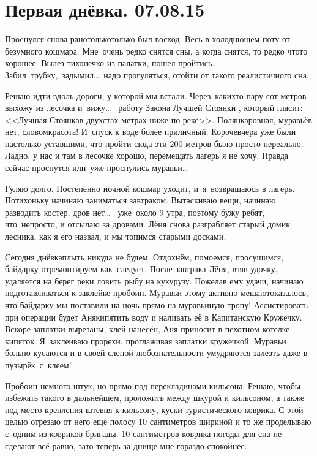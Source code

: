 \chapter{Первая днёвка. 07.08.15}

Проснулся снова рано\mdash только\sdash только был восход. Весь в холоднющем поту от безумного кошмара. Мне~очень редко снятся сны, а когда снятся, то редко что\sdash то хорошее. Вылез тихонечко из палатки, пошел пройтись. Забил~трубку,~задымил\ldots ~надо прогуляться, отойти от такого реалистичного сна.

Решаю идти вдоль дороги, у которой мы встали. Через~каких\sdash то пару сот метров выхожу из лесочка и~вижу\ldots~ работу Закона Лучшей Стоянки \cite{Квадригин}, который гласит: <<Лучшая Стоянка\mdash в двухстах метрах ниже по реке>>. Полянка\mdash ровная, муравьёв нет, словом\mdash красота! И~спуск к воде более приличный. Короче\mdash вчера уже были настолько уставшими, что пройти сюда эти 200 метров было просто нереально. Ладно, у нас и там в лесочке хорошо, перемещать лагерь я не хочу. Правда сейчас проснутся или~уже проснулись муравьи\ldots~

Гуляю долго. Постепенно ночной кошмар уходит, и~я~возвращаюсь в лагерь. Потихоньку начинаю заниматься завтраком. Вытаскиваю вещи, начинаю разводить костер, дров нет\ldots~ уже~около 9 утра, поэтому бужу ребят, что~непросто, и отсылаю за дровами. Лёня снова разграбляет старый домик лесника, как я его назвал, и мы топимся старыми досками. 

Сегодня днёвка\mdash плыть никуда не будем. Отдохнём, помоемся, просушимся, байдарку отремонтируем как~следует. После завтрака Лёня, взяв удочку, удаляется на берег реки ловить рыбу на кукурузу. Пожелав ему удачи, начинаю подготавливаться к заклейке пробоин. Муравьи этому активно мешают\mdash оказалось, что байдарку мы поставили на ночь прямо на муравьиную тропу! Ассистировать при операции будет Аня\mdash кипятить воду и наливать её в Капитанскую Кружечку. Вскоре заплатки вырезаны, клей нанесён, Аня приносит в пехотном котелке кипяток. Я~заклеиваю прорехи, проглаживая заплатки кружечкой. Муравьи больно кусаются и в своей слепой любознательности умудряются залезть даже в пузырёк~с~клеем! 

Пробоин немного штук, но прямо под перекладинами кильсона. Решаю, чтобы избежать такого в дальнейшем, проложить между шкурой и кильсоном, а также под место крепления штевня к кильсону, куски туристического коврика. С этой целью отрезаю от него ещё полосу 10 сантиметров шириной и то же проделываю с~одним из ковриков бригады. 10 сантиметров коврика погоды для сна не сделают всё равно, зато теперь за днище мне гораздо спокойнее. 

